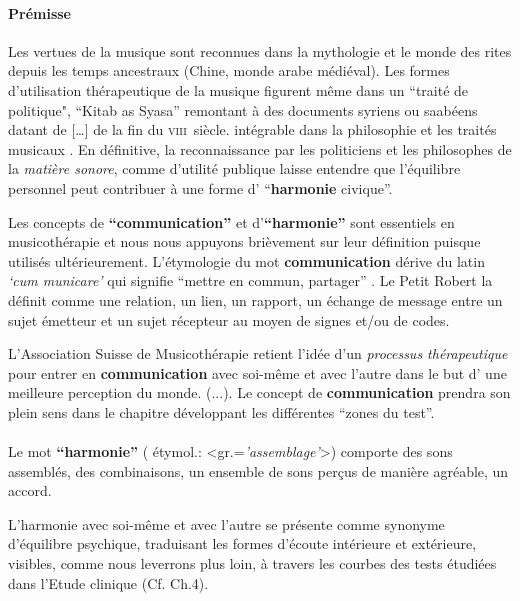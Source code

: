 \paragraph{Prémisse}

Les vertues de la musique sont reconnues dans la mythologie et le
monde des rites depuis les temps ancestraux (Chine, monde arabe
médiéval). 
Les formes d'utilisation 
thérapeutique de la musique figurent même dans un ``traité de politique",
``Kitab as Syasa'' remontant à des documents syriens ou saabéens datant de  [\dots] de la fin du 
\textsc{viii}\ieme\ siècle.   intégrable dans la 
philosophie et les traités musicaux \autocite[ch. III, p. 
96]{vrait_musicotherapie_2018}.
En définitive, la reconnaissance par les  politiciens  et les
philosophes de la \textit{matière sonore}, comme d'utilité
publique laisse entendre que l'équilibre personnel
peut contribuer à une forme d' ``\textbf{harmonie }civique''.




Les concepts de \textbf{``communication''} et  d'\textbf{``harmonie''} 
sont essentiels en
musicothérapie et nous nous appuyons brièvement
sur leur définition puisque utilisés ultérieurement.
L'étymologie du mot  \textbf{communication} dérive du latin  \textit{`cum
  municare'} qui signifie ``mettre en commun, partager'' \autocite{dicpetitrobert}. 
Le Petit Robert la définit comme une
relation, un lien, un rapport, un échange de message entre un sujet émetteur et un
sujet récepteur au moyen de signes et/ou de codes.

L'Association Suisse
de Musicothérapie retient l'idée d'un\textit{ processus thérapeutique }pour entrer en \textbf{communication} avec soi-même et avec 
l'autre dans le but d' une meilleure perception du
monde. (...)\autocite{site_musitherapy}.
Le concept de \textbf{communication} prendra son plein sens 
dans le chapitre développant les différentes ``zones du test''.
\paragraph{}
Le mot \textbf{``harmonie''} ( étymol.:
<gr.=\textit{'assemblage'}>) comporte 
 des sons assemblés, des combinaisons, un ensemble de sons perçus de
 manière agréable, un accord.
 
 L'harmonie avec soi-même et avec l'autre se présente comme  synonyme d'équilibre
psychique, traduisant les formes d'écoute intérieure et
extérieure,  visibles, comme nous leverrons plus loin, à travers les courbes des tests étudiées
dans l'Etude clinique (Cf. Ch.4).



